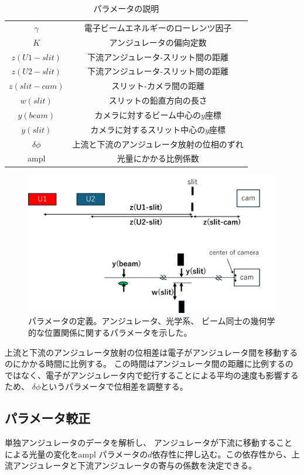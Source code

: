 \documentclass[a4paper,11pt,uplatex]{jsbook}
\begin{document}
\begin{table}[h]
\centering
\begin{tabular}{c|c}
  $\gamma$ & 電子ビームエネルギーのローレンツ因子 \\
  $K$ & アンジュレータの偏向定数 \\
  $z(U1-slit)$ & 下流アンジュレータ-スリット間の距離\\
  $z(U2-slit)$ & 下流アンジュレータ-スリット間の距離 \\
  $z(slit-cam)$ & スリット-カメラ間の距離 \\
  $w(slit)$ & スリットの鉛直方向の長さ \\
  $y(beam)$ & カメラに対するビーム中心の$y$座標 \\
  $y(slit)$ & カメラに対するスリット中心の$y$座標 \\
  $\delta \phi$ & 上流と下流のアンジュレータ放射の位相のずれ\\
  ampl & 光量にかかる比例係数
\end{tabular}
\caption[パラメータの説明]{パラメータの説明}\label{tab:prm}
\end{table}
\begin{figure}[h]
  \centering
  \includegraphics[width=0.8\linewidth]{image/4-prm.png}
  \caption[パラメータの定義]{パラメータの定義。アンジュレータ、光学系、
  ビーム同士の幾何学的な位置関係に関するパラメータを示した。}\label{prm}
\end{figure}
上流と下流のアンジュレータ放射の位相差は電子がアンジュレータ間を移動するのにかかる時間に比例する。
この時間はアンジュレータ間の距離に比例するのではなく、電子がアンジュレータ内で蛇行することによる平均の速度も影響するため、
$\delta \phi$というパラメータで位相差を調整する。


\subsection{パラメータ較正}
単独アンジュレータのデータを解析し、
アンジュレータが下流に移動することによる光量の変化をampl パラメータの$d$依存性に押し込む。この依存性から、上流アンジュレータと下流アンジュレータの寄与の係数を決定できる。
\end{document}

